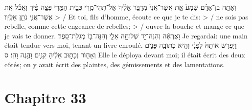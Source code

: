 \begin{paracol}[1]
  {וְאַתָּ֣ה בֶן־אָדָ֗ם שְׁמַע֙ אֵ֤ת אֲשֶׁר־אֲנִי֙ מְדַבֵּ֣ר אֵלֶ֔יךָ
    אַל־תְּהִי־מֶ֖רִי כְּבֵ֣ית הַמֶּ֑רִי
    פְּצֵ֣ה פִ֔יךָ וֶאֱכֹ֕ל אֵ֥ת אֲשֶׁר־אֲנִ֖י נֹתֵ֥ן אֵלֶֽיךָ׃}
  {> / Et toi, fils d’homme, écoute ce que je te dis:
    > / ne sois pas rebelle, comme cette engeance de rebelles;
    > / ouvre la bouche et mange ce que je vais te donner.}
  \verset
  {וָאֶרְאֶ֕ה וְהִנֵּה־יָ֖ד שְׁלוּחָ֣ה אֵלָ֑י
    וְהִנֵּה־ב֖וֹ מְגִלַּת־סֵֽפֶר׃}
  {Je regardai: une main était tendue vers moi,
    tenant un livre enroulé.}
  \verset
  {וַיִּפְרֹ֤שׂ אוֹתָהּ֙ לְפָנַ֔י וְהִ֥יא כְתוּבָ֖ה פָּנִ֣ים וְאָח֑וֹר
    וְכָת֣וּב אֵלֶ֔יהָ קִנִ֥ים וָהֶ֖גֶה וָהִֽי׃ ס}
  {Elle le déploya devant moi; il était écrit des deux côtés;
    on y avait écrit des plaintes, des gémissements et des lamentations.}
  \clearpage

  \section*{Chapitre 33}

\end{paracol}
